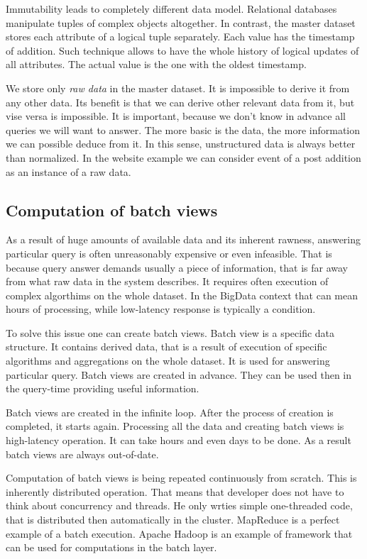 Immutability leads to completely different data model.
Relational databases manipulate tuples of complex objects altogether.
In contrast, the master dataset stores each attribute of a logical tuple separately.
Each value has the timestamp of addition. 
Such technique allows to have the whole history of logical updates of all attributes.
The actual value is the one with the oldest timestamp.

We store only \textit{raw data} in the master dataset.
It is impossible to derive it from any other data.
Its benefit is that we can derive other relevant data from it, but vise versa is impossible.
It is important, because we don't know in advance all queries we will want to answer.
The more basic is the data, the more information we can possible deduce from it.
In this sense, unstructured data is always better than normalized.
In the website example we can consider event of a post addition as an instance of a raw data.

\subsection{Computation of batch views}

As a result of huge amounts of available data and its inherent rawness,
answering particular query is often unreasonably expensive or even infeasible. 
That is because query answer demands usually a piece of information, that is far
away from what raw data in the system describes.
It requires often execution of complex algorthims on the whole dataset.
In the BigData context that can mean hours of processing, while low-latency
response is typically a condition.

To solve this issue one can create batch views.
Batch view  is a specific data structure.
It contains derived data, that is a result of execution of specific algorithms
and aggregations on the whole dataset.
It is used for answering particular query.
Batch views are created in advance.
They can be used then in the query-time providing useful information.

Batch views are created in the infinite loop.
After the process of creation is completed, it starts again.
Processing all the data and creating batch views is high-latency operation.
It can take hours and even days to be done.
As a result batch views are always out-of-date.

Computation of batch views is being repeated continuously from scratch.
This is inherently distributed operation.
That means that developer does not have to think about concurrency and threads.
He only wrties simple one-threaded code, that is distributed then
automatically in the cluster.
MapReduce is a perfect example of a batch execution.
Apache Hadoop is an example of framework that can be used for computations in
the batch layer.